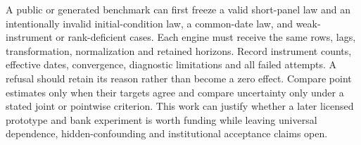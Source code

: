 A public or generated benchmark can first freeze a valid short-panel law and
an intentionally invalid initial-condition law, a common-date law, and
weak-instrument or rank-deficient cases. Each engine must receive the same
rows, lags, transformation, normalization and retained horizons. Record
instrument counts, effective dates, convergence, diagnostic limitations and
all failed attempts. A refusal should retain its reason rather than become
a zero effect. Compare point estimates only when their targets agree and
compare uncertainty only under a stated joint or pointwise criterion. This
work can justify whether a later licensed prototype and bank experiment is
worth funding while leaving universal dependence, hidden-confounding and
institutional acceptance claims open.
